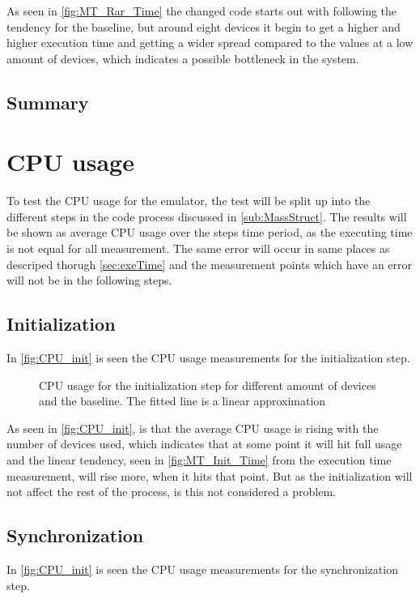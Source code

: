 As seen in \autoref{fig:MT_Rar_Time} the changed code starts out with following the tendency for the baseline, but around eight devices it begin to get a higher and higher execution time and getting a wider spread compared to the values at a low amount of devices, which indicates a possible bottleneck in the system.

\subsection{Summary}


\section{CPU usage}
To test the CPU usage for the emulator, the test will be split up into the different steps in the code process discussed in \autoref{sub:MassStruct}. The results will be shown as average CPU usage over the steps time period, as the executing time is not equal for all measurement. The same error will occur in same places as descriped thorugh \autoref{sec:exeTime} and the measurement points which have an error will not be in the following steps.

\subsection{Initialization}
In \autoref{fig:CPU_init} is seen the CPU usage measurements for the initialization step.

\begin{figure}[H]
\centering
\resizebox{0.5\textwidth}{!}{
}
\caption{CPU usage for the initialization step for different amount of devices and the baseline. The fitted line is a linear approximation}
\label{fig:CPU_init}
\end{figure}

As seen in \autoref{fig:CPU_init}, is that the average CPU usage is rising with the number of devices used, which indicates that at some point it will hit full usage and the linear tendency, seen in \autoref{fig:MT_Init_Time} from the execution time measurement, will rise more, when it hits that point. But as the initialization will not affect the rest of the process, is this not considered a problem.

\subsection{Synchronization}
In \autoref{fig:CPU_init} is seen the CPU usage measurements for the synchronization step.

